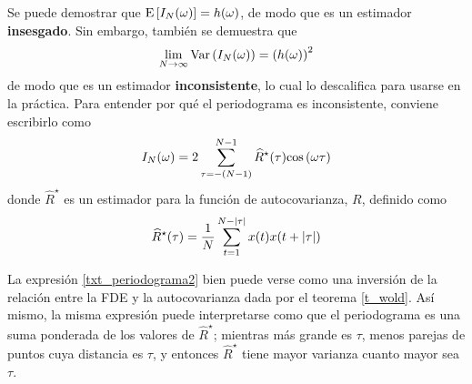 
Se puede demostrar que $\mathrm{E}\left[ I_N(\omega) \right] = h(\omega)$, de modo que es un estimador 
\textbf{insesgado}. Sin embargo, también se demuestra que
\begin{equation*}
\lim_{N\rightarrow \infty} \mathrm{Var}\left( I_N(\omega) \right) = \left( h(\omega) \right)^{2}
\end{equation*}
de modo que es un estimador \textbf{inconsistente}, lo cual lo descalifica para usarse en la 
práctica.
%
Para entender por qué el periodograma es inconsistente, conviene escribirlo como
\begin{equation}
I_N(\omega) = 2 \sum_{\tau = -(N-1)}^{N-1} \widehat{R}^{\star}(\tau) \mathrm{cos}\left( \omega \tau \right)
\label{txt_periodograma2}
\end{equation}
%
donde $\widehat{R}^{\star}$ es un estimador para la función de autocovarianza, $R$, definido como
\begin{equation}
\widehat{R}^{\star} (\tau) = \frac{1}{N} \sum_{t = 1}^{N-\left| \tau \right|} x(t) x(t+\left| \tau \right|)
\end{equation}

%
La expresión \ref{txt_periodograma2} bien puede verse como una inversión de la relación entre la
FDE y la autocovarianza dada por el teorema \ref{t_wold}.
%
Así mismo, la misma expresión puede interpretarse como que el periodograma es una suma ponderada de 
los valores de $\widehat{R}^{\star}$; mientras más grande es $\tau$, menos parejas de puntos cuya 
distancia es $\tau$, y entonces $\widehat{R}^{\star}$ tiene mayor varianza cuanto mayor sea $\tau$. 

